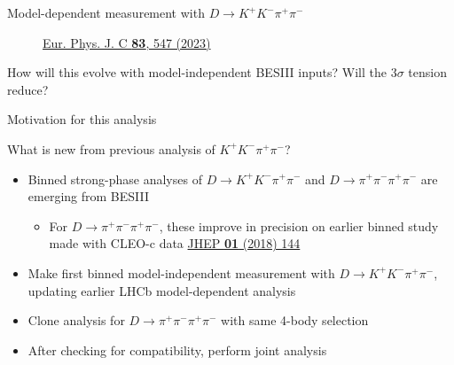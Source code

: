 \documentclass[xcolor={dvipsnames}]{beamer}
\begin{document}
\begin{frame}{Model-dependent measurement with $D\to K^+K^-\pi^+\pi^-$}
\begin{figure}[htb]
\begin{subfigure}{0.5\textwidth}
    \end{subfigure}
    \vspace{-0.5cm}
    \caption*{\tiny\href{https://link.springer.com/article/10.1140/epjc/s10052-023-11560-5}{Eur. Phys. J. C \textbf{83}, 547 (2023)}}
  \end{figure}
  \vspace{-0.5cm}
  \begin{center}
    {\large How will this evolve with model-independent BESIII inputs? Will the $3\sigma$ tension reduce?}
  \end{center}
\end{frame}

\begin{frame}{Motivation for this analysis}
  \begin{center}
    {\Large What is new from previous analysis of $K^+K^-\pi^+\pi^-$?}
  \end{center}
  \begin{itemize}
    \setlength\itemsep{1.0em}
    \item{Binned strong-phase analyses of $D\to K^+K^-\pi^+\pi^-$ and $D\to\pi^+\pi^-\pi^+\pi^-$ are emerging from BESIII}
    \begin{itemize}
      \item{For $D\to\pi^+\pi^-\pi^+\pi^-$, these improve in precision on earlier binned study made with CLEO-c data \href{https://link.springer.com/article/10.1007/JHEP01(2018)144}{JHEP \textbf{01} (2018) 144}}
    \end{itemize}
    \item{Make first binned model-independent measurement with $D\to K^+K^-\pi^+\pi^-$, updating earlier LHCb model-dependent analysis}
    \item{Clone analysis for $D\to\pi^+\pi^-\pi^+\pi^-$ with same 4-body selection}
    \item{After checking for compatibility, perform joint analysis}
  \end{itemize}
\end{frame}
\end{document}
